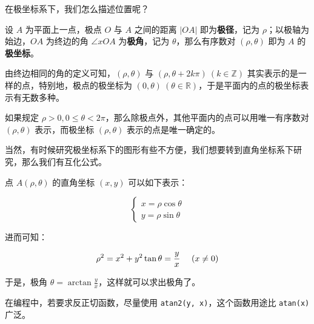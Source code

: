 在极坐标系下，我们怎么描述位置呢？

设 $A$ 为平面上一点，极点 $O$ 与 $A$ 之间的距离 $|OA|$ 即为\textbf{极径}，记为 $\rho$；以极轴为始边，$OA$ 为终边的角 $\angle xOA$ 为\textbf{极角}，记为 $\theta$，那么有序数对 $(\rho,\theta)$ 即为 $A$ 的\textbf{极坐标}。

由终边相同的角的定义可知，$(\rho,\theta)$ 与 $(\rho,\theta+2k\pi)\ (k\in \mathbb{Z})$ 其实表示的是一样的点，特别地，极点的极坐标为 $(0,\theta)\ (\theta\in \mathbb{R})$，于是平面内的点的极坐标表示有无数多种。

如果规定 $\rho>0,0\le \theta<2\pi​$，那么除极点外，其他平面内的点可以用唯一有序数对 $(\rho,\theta)​$ 表示，而极坐标 $(\rho,\theta)​$ 表示的点是唯一确定的。

当然，有时候研究极坐标系下的图形有些不方便，我们想要转到直角坐标系下研究，那么我们有互化公式。

点 $A(\rho,\theta)$ 的直角坐标 $(x,y)$ 可以如下表示：

$$
\begin{cases}
x=\rho \cos \theta\\
y=\rho \sin \theta
\end{cases}
$$

进而可知：

$$
\rho ^2=x^2+y^2\\
\tan \theta=\frac{y}{x}\ \ \ \ (x\not =0)
$$

于是，极角 $\theta=\arctan \frac{y}{x}$，这样就可以求出极角了。

在编程中，若要求反正切函数，尽量使用 \texttt{atan2(y, x)}，这个函数用途比 \texttt{atan(x)} 广泛。

